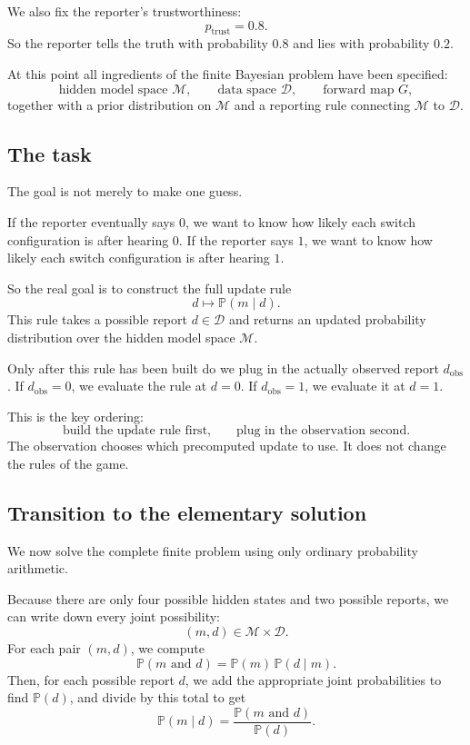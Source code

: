 \documentclass[11pt]{article}
\newcommand{\M}{\mathcal{M}}
\newcommand{\D}{\mathcal{D}}
\newcommand{\dobs}{d_{\mathrm{obs}}}
\newcommand{\ptrust}{p_{\mathrm{trust}}}
\begin{document}
We also fix the reporter's trustworthiness:
\[
    \ptrust=0.8.
\]
So the reporter tells the truth with probability \(0.8\) and lies with probability \(0.2\).

At this point all ingredients of the finite Bayesian problem have been specified:
\[
    \text{hidden model space } \M,
    \qquad
    \text{data space } \D,
    \qquad
    \text{forward map } G,
\]
together with a prior distribution on \(\M\) and a reporting rule connecting \(\M\) to \(\D\).

\subsection{The task}

The goal is not merely to make one guess.

If the reporter eventually says \(0\), we want to know how likely each switch configuration is after hearing \(0\). If the reporter says \(1\), we want to know how likely each switch configuration is after hearing \(1\).

So the real goal is to construct the full update rule
\[
    d \longmapsto \mathbb{P}(m\mid d).
\]
This rule takes a possible report \(d\in\D\) and returns an updated probability distribution over the hidden model space \(\M\).

Only after this rule has been built do we plug in the actually observed report \(\dobs\). If \(\dobs=0\), we evaluate the rule at \(d=0\). If \(\dobs=1\), we evaluate it at \(d=1\).

This is the key ordering:
\[
    \text{build the update rule first,}
    \qquad
    \text{plug in the observation second.}
\]
The observation chooses which precomputed update to use. It does not change the rules of the game.

\subsection{Transition to the elementary solution}

We now solve the complete finite problem using only ordinary probability arithmetic.

Because there are only four possible hidden states and two possible reports, we can write down every joint possibility:
\[
    (m,d)\in \M\times\D.
\]
For each pair \((m,d)\), we compute
\[
    \mathbb{P}(m\text{ and }d)
    =
    \mathbb{P}(m)\,\mathbb{P}(d\mid m).
\]
Then, for each possible report \(d\), we add the appropriate joint probabilities to find \(\mathbb{P}(d)\), and divide by this total to get
\[
    \mathbb{P}(m\mid d)
    =
    \frac{\mathbb{P}(m\text{ and }d)}{\mathbb{P}(d)}.
\]
\end{document}
